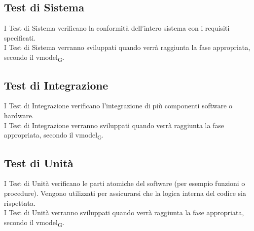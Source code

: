 \begin{longtable}{ >{\centering}p{} >{}p{}
		>{\centering}p{}}
	
	
\end{longtable}

\subsection{Test di Sistema}
I Test di Sistema verificano la conformità dell'intero sistema con i requisiti specificati.\\I Test di Sistema verranno sviluppati quando verrà raggiunta la fase appropriata, secondo il \gls{vmodel}\textsubscript{G}.

\subsection{Test di Integrazione}
I Test di Integrazione verificano l'integrazione di più componenti software o hardware.\\I Test di Integrazione verranno sviluppati quando verrà raggiunta la fase appropriata, secondo il \gls{vmodel}\textsubscript{G}.

\subsection{Test di Unità}
I Test di Unità verificano le parti atomiche del software (per esempio funzioni o procedure). Vengono utilizzati per assicurarsi che la logica interna del codice sia rispettata.\\I Test di Unità verranno sviluppati quando verrà raggiunta la fase appropriata, secondo il \gls{vmodel}\textsubscript{G}.
